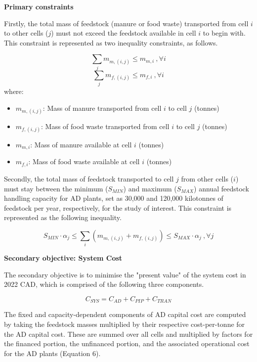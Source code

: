 \documentclass[12pt]{article}
\begin{document}
\vspace{10pt}
\textbf{Primary constraints}

Firstly, the total mass of feedstock (manure or food waste) transported from cell $i$ to other cells ($j$) must not exceed the feedstock available in cell $i$ to begin with. This constraint is represented as two inequality constraints, as follows.

\begin{equation}
  \sum_{j} m_{m, (i,j)} \leq m_{m, i} \ , \forall i
\end{equation}
\begin{equation}
  \sum_{j} m_{f, (i,j)} \leq m_{f, i} \ , \forall i
\end{equation}
where:
\begin{itemize}
  \item $m_{m, (i,j)}$: Mass of manure transported from cell $i$ to cell $j$ (tonnes)
  \item $m_{f, (i,j)}$: Mass of food waste transported from cell $i$ to cell $j$ (tonnes)
  \item $m_{m, i}$: Mass of manure available at cell $i$ (tonnes)
  \item $m_{f, i}$: Mass of food waste available at cell $i$ (tonnes)
\end{itemize}

Secondly, the total mass of feedstock transported to cell $j$ from other cells ($i$) must stay between the minimum ($S_{MIN}$) and maximum ($S_{MAX}$) annual feedstock handling capacity for AD plants, set as 30,000 and 120,000 kilotonnes of feedstock per year, respectively, for the study of interest. This constraint is represented as the following inequality.

\begin{equation}
  S_{MIN} \cdot \alpha_j \leq \sum_{i} (m_{m, (i,j)} + m_{f, (i,j)}) \leq S_{MAX} \cdot \alpha_j \ , \forall j
\end{equation}

\textbf{Secondary objective: System Cost}

The secondary objective is to minimise the "present value" of the system cost in 2022 CAD, which is comprised of the following three components.

\begin{equation}
  C_{SYS} = C_{AD} + C_{PIP} + C_{TRAN}
\end{equation}

The fixed and capacity-dependent components of AD capital cost are computed by taking the feedstock masses multiplied by their respective cost-per-tonne for the AD capital cost. These are summed over all cells and multiplied by factors for the financed portion, the unfinanced portion, and the associated operational cost for the AD plants (Equation 6).
\end{document}
